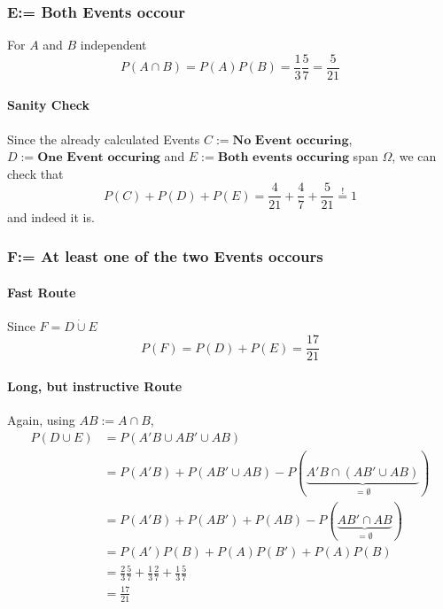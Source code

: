 \subsubsection{E:= Both Events occour}
For $A$ and $B$ independent
\begin{equation}
    P\left(A\cap B\right)=P\left(A\right)P\left(B\right)=\frac{1}{3}\frac{5}{7}=\frac{5}{21}
\end{equation}
\paragraph{Sanity Check}
Since the already calculated Events $C:=\textbf{No Event occuring}$, $D:=\textbf{One Event occuring}$ and $E:=\textbf{Both events occuring}$ span $\Omega$, we can check that
\begin{equation}
    P\left(C\right)+P\left(D\right)+P\left(E\right)=\frac{4}{21}+\frac{4}{7}+\frac{5}{21}\overset{!}{=}1
\end{equation}
and indeed it is.
\subsubsection{F:= At least one of the two Events occours}
\paragraph{Fast Route}
Since $F=D\dot\cup E$
\begin{equation}
    P\left(F\right)=P\left(D\right)+P\left(E\right)=\frac{17}{21}
\end{equation}
\paragraph{Long, but instructive Route}
Again, using $AB:=A\cap B$,
\begin{align}
    P\left(D\cup E\right)&=P\left(A'B\cup AB'\cup AB\right)
    \\&=P\left(A'B\right)+P\left(AB'\cup AB\right)-P\left(\underbrace{A'B\cap\left(AB'\cup AB\right)}_{=\emptyset}\right)\label{disjointIntersection2}
    \\&=P\left(A'B\right)+P\left(AB'\right)+P\left(AB\right)-P\left(\underbrace{AB'\cap AB}_{=\emptyset}\right)\label{disjointIntersection3}
    \\&=P\left(A'\right)P\left(B\right)+P\left(A\right)P\left(B'\right)+P\left(A\right)P\left(B\right)
    \\&=\frac{2}{3}\frac{5}{7}+\frac{1}{3}\frac{2}{7}+\frac{1}{3}\frac{5}{7}
    \\&=\frac{17}{21}
\end{align}
